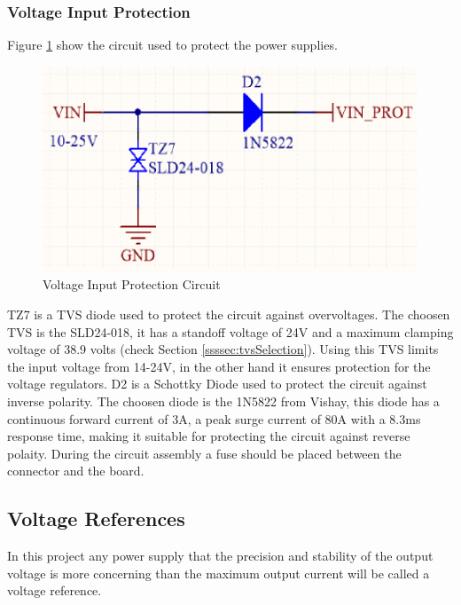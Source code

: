 		\subsubsection{Voltage Input Protection}\label{sssec:voltage-input-protection}

			Figure \ref{fig:input-protection-circuit} show the circuit used to protect the power supplies.

			\begin{figure}[htbp]
				\centering
					\includegraphics[scale=1]{figuras/fig-input-protection-circuit.png}
				\caption{Voltage Input Protection Circuit \cite{input-protection-circuit}}
				\label{fig:input-protection-circuit}
			\end{figure}

			TZ7 is a TVS diode used to protect the circuit against overvoltages. The choosen TVS is the SLD24-018, it has a standoff voltage of 24V and a maximum clamping voltage of 38.9 volts (check Section \ref{ssssec:tvsSelection}). Using this TVS limits the input voltage from 14-24V, in the other hand it ensures protection for the voltage regulators. D2 is a Schottky Diode used to protect the circuit against inverse polarity. The choosen diode is the 1N5822 \cite{1n5822-datasheet} from Vishay, this diode has a continuous forward current of 3A, a peak surge current of 80A  with a 8.3ms response time, making it suitable for protecting the circuit against reverse polaity. During the circuit assembly a fuse should be placed between the connector and the board.
			
	\subsection{Voltage References}\label{ssec:voltage-references}

		In this project any power supply that the precision and stability of the output voltage is more concerning than the maximum output current will be called a voltage reference.

